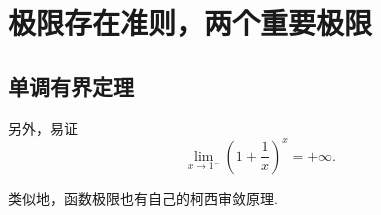 \section{极限存在准则，两个重要极限}
\subsection{单调有界定理}

另外，易证\[
\lim_{x\to1^-} \left(1+\frac1x\right)^x = +\infty.
\]

类似地，函数极限也有自己的柯西审敛原理.
